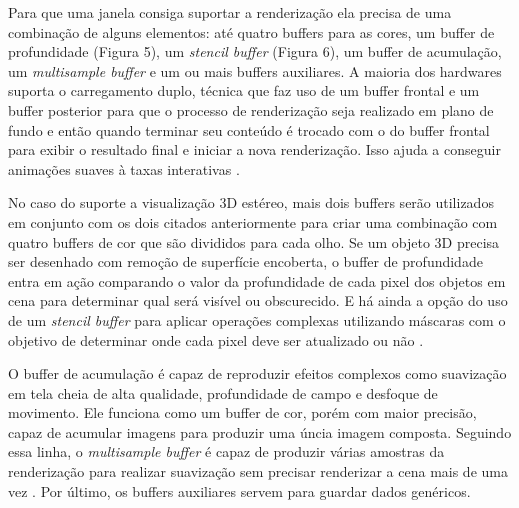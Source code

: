 Para que uma janela consiga suportar a renderização ela precisa de uma combinação de alguns elementos: até quatro buffers para as cores, um buffer de profundidade (Figura 5), um \textit{stencil buffer} (Figura 6), um buffer de acumulação, um \textit{multisample buffer} e um ou mais buffers auxiliares. A maioria dos hardwares suporta o carregamento duplo, técnica que faz uso de um buffer frontal e um buffer posterior para que o processo de renderização seja realizado em plano de fundo e então quando terminar seu conteúdo é trocado com o do buffer frontal para exibir o resultado final e iniciar a nova renderização. Isso ajuda a conseguir animações suaves à taxas interativas \cite{GLSLBook}.

\begin{figure}[h!]
	\centering
\end{figure}
\nocite{stcbuf}
	
No caso do suporte a visualização 3D estéreo, mais dois buffers serão utilizados em conjunto com os dois citados anteriormente para criar uma combinação com quatro buffers de cor que são divididos para cada olho. Se um objeto 3D precisa ser desenhado com remoção de superfície encoberta, o buffer de profundidade entra em ação comparando o valor da profundidade de cada pixel dos objetos em cena para determinar qual será visível ou obscurecido. E há ainda a opção do uso de um \textit{stencil buffer} para aplicar operações complexas utilizando máscaras com o objetivo de determinar onde cada pixel deve ser atualizado ou não \cite{GLSLBook}.

O buffer de acumulação é capaz de reproduzir efeitos complexos como suavização em tela cheia de alta qualidade, profundidade de campo e desfoque de movimento. Ele funciona como um buffer de cor, porém com maior precisão, capaz de acumular imagens para produzir uma úncia imagem composta. Seguindo essa linha, o \textit{multisample buffer} é capaz de produzir várias amostras da renderização para realizar suavização sem precisar renderizar a cena mais de uma vez \cite{GLSLBook}. Por último, os buffers auxiliares servem para guardar dados genéricos.

